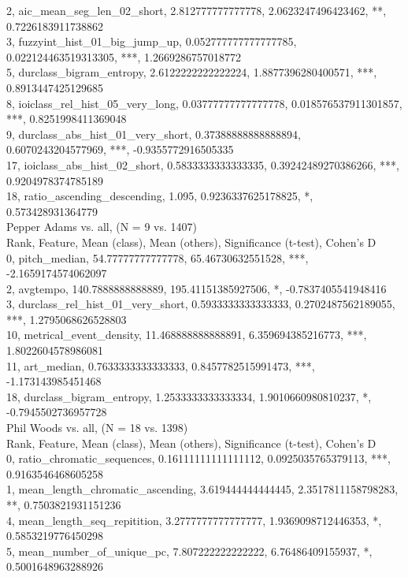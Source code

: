 2, aic_mean_seg_len_02_short, 2.812777777777778, 2.0623247496423462, **, 0.7226183911738862\\
3, fuzzyint_hist_01_big_jump_up, 0.052777777777777785, 0.022124463519313305, ***, 1.2669286757018772\\
5, durclass_bigram_entropy, 2.6122222222222224, 1.8877396280400571, ***, 0.8913447425129685\\
8, ioiclass_rel_hist_05_very_long, 0.03777777777777778, 0.018576537911301857, ***, 0.8251998411369048\\
9, durclass_abs_hist_01_very_short, 0.37388888888888894, 0.6070243204577969, ***, -0.9355772916505335\\
17, ioiclass_abs_hist_02_short, 0.5833333333333335, 0.39242489270386266, ***, 0.9204978374785189\\
18, ratio_ascending_descending, 1.095, 0.9236337625178825, *, 0.573428931364779\\
Pepper Adams vs. all, (N = 9 vs. 1407)\\
Rank, Feature, Mean (class), Mean (others), Significance (t-test), Cohen's D\\
0, pitch_median, 54.77777777777778, 65.46730632551528, ***, -2.1659174574062097\\
2, avgtempo, 140.7888888888889, 195.41151385927506, *, -0.7837405541948416\\
3, durclass_rel_hist_01_very_short, 0.5933333333333333, 0.2702487562189055, ***, 1.2795068626528803\\
10, metrical_event_density, 11.468888888888891, 6.359694385216773, ***, 1.8022604578986081\\
11, art_median, 0.7633333333333333, 0.8457782515991473, ***, -1.173143985451468\\
18, durclass_bigram_entropy, 1.2533333333333334, 1.9010660980810237, *, -0.7945502736957728\\
Phil Woods vs. all, (N = 18 vs. 1398)\\
Rank, Feature, Mean (class), Mean (others), Significance (t-test), Cohen's D\\
0, ratio_chromatic_sequences, 0.16111111111111112, 0.0925035765379113, ***, 0.9163546468605258\\
1, mean_length_chromatic_ascending, 3.619444444444445, 2.3517811158798283, **, 0.7503821931151236\\
4, mean_length_seq_repitition, 3.2777777777777777, 1.9369098712446353, *, 0.5853219776450298\\
5, mean_number_of_unique_pc, 7.807222222222222, 6.76486409155937, *, 0.5001648963288926\\
